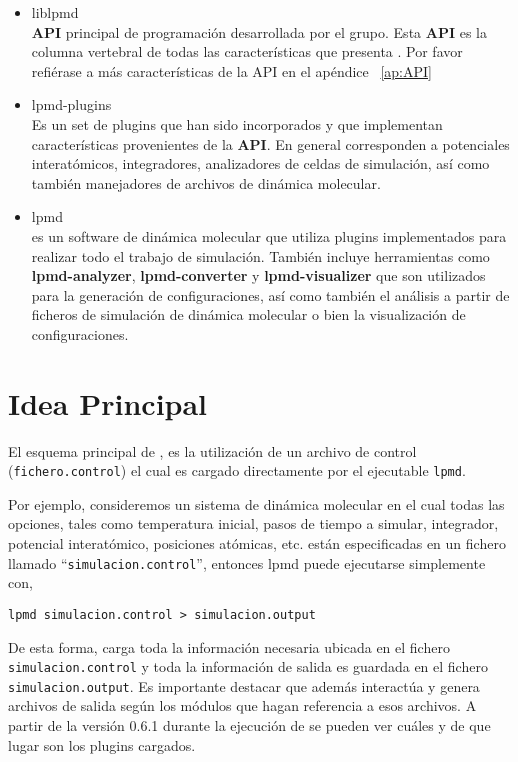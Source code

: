 \begin{itemize}
 \item liblpmd \\
\textbf{API} principal de programaci\'on desarrollada por el grupo. Esta \textbf{API} es la columna vertebral de todas las caracter\'isticas que presenta {\lpmd}. Por favor refi\'erase a m\'as caracter\'isticas de la API en el ap\'endice ~\ref{ap:API}
 \item lpmd-plugins \\
Es un set de plugins que han sido incorporados y que implementan caracter\'isticas provenientes de la \textbf{API}. En general corresponden a potenciales interat\'omicos, integradores, analizadores de celdas de simulaci\'on, as\'i como tambi\'en manejadores de archivos de din\'amica molecular.
 \item lpmd \\
{\lpmd} es un software de din\'amica molecular que utiliza plugins implementados para realizar todo el trabajo de simulaci\'on. Tambi\'en incluye herramientas como \textbf{lpmd-analyzer}, \textbf{lpmd-converter} y \textbf{lpmd-visualizer} que son utilizados para la generaci\'on de configuraciones, as\'i como tambi\'en el an\'alisis a partir de ficheros de simulaci\'on de din\'amica molecular o bien la visualizaci\'on de configuraciones.
\end{itemize}

\section{Idea Principal}

El esquema principal de {\lpmd}, es la utilizaci\'on de un archivo de control (\verb|fichero.control|) el cual es cargado directamente por el ejecutable \verb|lpmd|.

Por ejemplo, consideremos un sistema de din\'amica molecular en el cual todas las opciones, tales como temperatura inicial, pasos de tiempo a simular, integrador, potencial interat\'omico, posiciones at\'omicas, etc. est\'an especificadas en un fichero llamado ``\verb|simulacion.control|'', entonces lpmd puede ejecutarse simplemente con,

\begin{center}
 \texttt{lpmd simulacion.control > simulacion.output}
\end{center}
\noindent

De esta forma, {\lpmd} carga toda la informaci\'on necesaria ubicada en el fichero \verb|simulacion.control| y toda la informaci\'on de salida es guardada en el fichero \verb|simulacion.output|. Es importante destacar que {\lpmd} adem\'as interact\'ua y genera archivos de salida seg\'un los m\'odulos que hagan referencia a esos archivos. A partir de la versi\'on 0.6.1 durante la ejecuci\'on de {\lpmd} se pueden ver cu\'ales y de que lugar son los plugins cargados.

